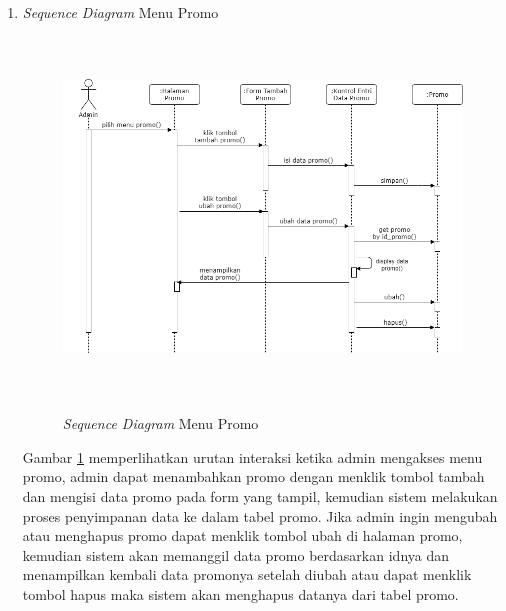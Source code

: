 \begin{enumerate}
	\newpage
	\item \textit{Sequence Diagram} Menu Promo
	\begin{figure}[H]
		\centering
		{\includegraphics [width = 12.5cm, height= 9.5cm]{gambar/sequence/tambah, ubah, hapus promo}}
		\caption{\textit{Sequence Diagram} Menu Promo}
		\label{seq promo}
	\end{figure}
	\par Gambar \ref*{seq promo} memperlihatkan urutan interaksi ketika admin mengakses menu promo, admin dapat menambahkan promo dengan menklik tombol tambah dan mengisi data promo pada form yang tampil, kemudian sistem melakukan proses penyimpanan data ke dalam tabel promo. Jika admin ingin mengubah atau menghapus promo dapat menklik tombol ubah di halaman promo, kemudian sistem akan memanggil data promo berdasarkan idnya dan menampilkan kembali data promonya setelah diubah atau dapat menklik tombol hapus maka sistem akan menghapus datanya dari tabel promo.


\end{enumerate}
